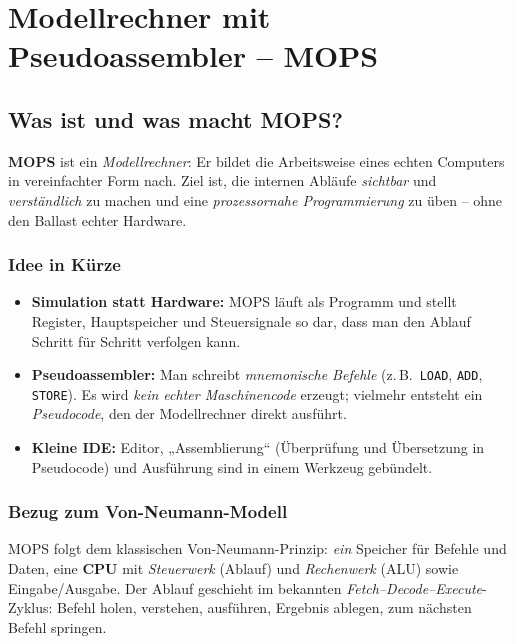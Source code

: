\documentclass[../skript/main.tex]{subfiles}
\begin{document}
	\chapter{Modellrechner mit Pseudoassembler – MOPS}\label{chap:mops}
	
	\section{Was ist und was macht MOPS?}
	\textbf{MOPS} ist ein \emph{Modellrechner}: Er bildet die Arbeitsweise eines echten Computers
	in vereinfachter Form nach. Ziel ist, die internen Abläufe \emph{sichtbar} und \emph{verständlich}
	zu machen und eine \emph{prozessornahe Programmierung} zu üben – ohne den Ballast
	echter Hardware.
	
	\subsection{Idee in Kürze}
	\begin{itemize}
		\item \textbf{Simulation statt Hardware:} MOPS läuft als Programm und stellt Register,
		Hauptspeicher und Steuersignale so dar, dass man den Ablauf Schritt für Schritt
		verfolgen kann.
		\item \textbf{Pseudoassembler:} Man schreibt \emph{mnemonische Befehle} (z.\,B.\ \texttt{LOAD}, \texttt{ADD}, \texttt{STORE}).
		Es wird \emph{kein echter Maschinencode} erzeugt; vielmehr entsteht ein \emph{Pseudocode},
		den der Modellrechner direkt ausführt.
		\item \textbf{Kleine IDE:} Editor, „Assemblierung“ (Überprüfung und Übersetzung in Pseudocode)
		und Ausführung sind in einem Werkzeug gebündelt.
	\end{itemize}
	
	\subsection{Bezug zum Von-Neumann-Modell}
	MOPS folgt dem klassischen Von-Neumann-Prinzip: \emph{ein} Speicher für Befehle und Daten,
	eine \textbf{CPU} mit \emph{Steuerwerk} (Ablauf) und \emph{Rechenwerk} (ALU) sowie
	Eingabe/Ausgabe. Der Ablauf geschieht im bekannten \emph{Fetch–Decode–Execute}-Zyklus:
	Befehl holen, verstehen, ausführen, Ergebnis ablegen, zum nächsten Befehl springen.
	
\end{document}
